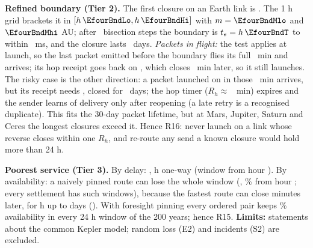 \textbf{Refined boundary (Tier 2).} The first closure on an Earth link is \EfourBndLink. The 1 h grid brackets it in $[h\,\EfourBndLo, h\,\EfourBndHi]$ with $m = \EfourBndMlo$ and $\EfourBndMhi$ AU; after \EfourBndIter\ bisection steps the boundary is $t_e = h\,\EfourBndT$ to within \EfourBndWidthMs\ ms, and the closure lasts \EfourBndDays\ days. \emph{Packets in flight:} the test applies at launch, so the last packet emitted before the boundary flies its full \EfourBndFlight\ min and arrives; its hop receipt goes back on \EfourBndRevLink, which closes \EfourBndOffsetMin\ min later, so it still launches. The risky case is the other direction: a packet launched on \EfourBndRevLink in those \EfourBndOffsetMin\ min arrives, but its receipt needs \EfourBndLink, closed for \EfourBndDays\ days; the hop timer ($R_h \approx$ \EfourBndRh\ min) expires and the sender learns of delivery only after reopening (a late retry is a recognised duplicate). This fits the 30-day packet lifetime, but at Mars, Jupiter, Saturn and Ceres the longest closures exceed it. Hence R16: never launch on a link whose reverse closes within one $R_h$, and re-route any send a known closure would hold more than 24 h.

\begin{table}[h]\centering
{}
\caption{Fastest-open-route one-way delay (empty queues) and worst 24 h availability over \EfourYears\ Julian years (hourly starts, all four routes of $\le 3$ links). \emph{Naive pin}:
fastest route at window start, held 24 h. \emph{Foresight pin}: route with the best availability over the next 24 h, computable from published geometry.}
\end{table}

\textbf{Poorest service (Tier 3).} By delay: \EfourWorstDelayPair, \EfourWorstDelay h one-way (window from hour \EfourWorstDelayAt). By availability: a naively pinned route can lose the whole window (\EfourWorstNaivePair, \EfourWorstNaive\% from hour \EfourWorstNaiveAt; every settlement has such windows), because the fastest route can close minutes later, for \EfourShortestH h up to \EfourLongestD days (\EfourLongestLink). With foresight pinning every ordered pair keeps \EfourWorstFore\% availability in every 24 h window of the 200 years; hence R15. \textbf{Limits:} statements about the common Kepler model; random loss (E2) and incidents (S2) are excluded.
